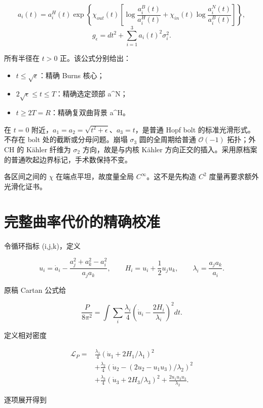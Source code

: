 \documentclass[UTF8,11pt,fontset=none]{ctexart}
\providecommand{\tightlist}{\setlength{\itemsep}{1pt}\setlength{\parskip}{0pt}}
\begin{document}
\[
 a_i(t)=a_i^H(t)\exp\left\{
 \chi_{out}(t)\left[
 \log\frac{a_i^B(t)}{a_i^H(t)}+
 \chi_{in}(t)\log\frac{a_i^N(t)}{a_i^B(t)}
 \right]\right\},
\] \[
 g_\epsilon=dt^2+\sum_{i=1}^3a_i(t)^2\sigma_i^2.
\tag{9.2}\label{eq:r9:2}
\]

所有半径在 \(t>0\) 正。该公式分别给出：

\begin{itemize}
\tightlist
\item
  \(t\le\sqrt\epsilon\)：精确 Burns 核心；
\item
  \(2\sqrt\epsilon\le t\le T\)：精确选定颈部 a\^{}N；
\item
  \(t\ge2T=R\)：精确复双曲背景 a\^{}H。
\end{itemize}

在 \(t=0\) 附近，\(a_1=a_2=\sqrt{t^2+\epsilon}\)、\(a_3=t\)，是普通 Hopf bolt 的标准光滑形式。不存在 bolt 处的截断或分母问题。崩塌 \(\sigma_3\) 圆的全周期给普通 \(\mathcal O(-1)\) 拓扑；外 CH 的 Kähler 纤维为 \(\sigma_2\) 方向，故是与内核 Kähler 方向正交的插入。采用原档案的普通吹起边界标记，手术数保持不变。

各区间之间的 \(\chi\) 在端点平坦，故度量全局 \(C^\infty\)。这不是先构造 \(C^2\) 度量再要求额外光滑化证书。

\section{完整曲率代价的精确校准}\label{ch9:ux5b8cux6574ux66f2ux7387ux4ee3ux4ef7ux7684ux7cbeux786eux6821ux51c6}

令循环指标 (i,j,k)，定义

\[
 u_i=\dot a_i-\frac{a_j^2+a_k^2-a_i^2}{a_ja_k},\qquad
 H_i=u_i+\frac12u_ju_k,\qquad
 \lambda_i=\frac{a_ja_k}{a_i}.
\]

原稿 Cartan 公式给

\[
\frac{P}{8\pi^2}=\int\sum_i\frac{\lambda_i}{4}
 \left(\dot u_i-\frac{2H_i}{\lambda_i}\right)^2dt.
\tag{9.3}\label{eq:r9:3}
\]

定义相对密度

\[
\begin{aligned}
\mathscr L_P={}&\frac{\lambda_1}{4}
(\dot u_1+2H_1/\lambda_1)^2\\
&+\frac{\lambda_2}{4}
(\dot u_2-(2u_2-u_1u_3)/\lambda_2)^2\\
&+\frac{\lambda_3}{4}
(\dot u_3+2H_3/\lambda_3)^2
+\frac{2u_1u_2u_3}{\lambda_2}.
\end{aligned}
\]

逐项展开得到
\end{document}
